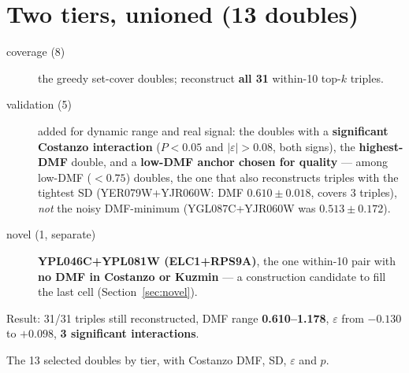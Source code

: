 \section{Two tiers, unioned (13 doubles)}

\begin{description}
  \item[coverage (8)] the greedy set-cover doubles; reconstruct \textbf{all 31} within-10
    top-$k$ triples.
  \item[validation (5)] added for dynamic range and real signal: the doubles with a
    \textbf{significant Costanzo interaction} ($P<0.05$ and $|\varepsilon|>0.08$, both signs),
    the \textbf{highest-DMF} double, and a \textbf{low-DMF anchor chosen for quality} ---
    among low-DMF ($<0.75$) doubles, the one that also reconstructs triples with the tightest
    SD (YER079W+YJR060W: DMF $0.610 \pm \mathbf{0.018}$, covers 3 triples), \emph{not} the
    noisy DMF-minimum (YGL087C+YJR060W was $0.513 \pm \mathbf{0.172}$).
  \item[novel (1, separate)] \textbf{YPL046C+YPL081W (ELC1+RPS9A)}, the one within-10 pair
    with \textbf{no DMF in Costanzo or Kuzmin} --- a construction candidate to fill the last
    cell (Section~\ref{sec:novel}).
\end{description}

Result: 31/31 triples still reconstructed, DMF range \textbf{0.610--1.178}, $\varepsilon$ from
$\mathbf{-0.130}$ to $\mathbf{+0.098}$, \textbf{3 significant interactions}.

%
  {The 13 selected doubles by tier, with Costanzo DMF, SD, $\varepsilon$ and $p$.}

